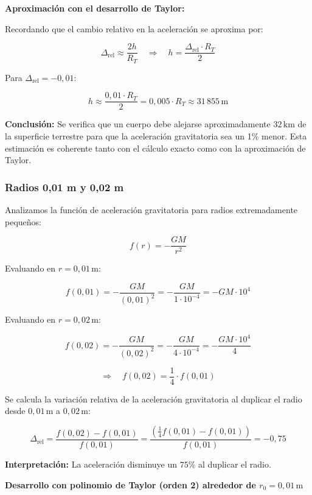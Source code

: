 \documentclass{article}
\begin{document}
\textbf{Aproximación con el desarrollo de Taylor:}

Recordando que el cambio relativo en la aceleración se aproxima por:

\[
\Delta_{\text{rel}} \approx \frac{2h}{R_T} \quad \Rightarrow \quad h = \frac{\Delta_{\text{rel}} \cdot R_T}{2}
\]

Para $\Delta_{\text{rel}} = -0{,}01$:

\[
h \approx \frac{0{,}01 \cdot R_T}{2} = 0{,}005 \cdot R_T \approx 31\,855\,\text{m}
\]

\vspace{0.5em}

\textbf{Conclusión:} Se verifica que un cuerpo debe alejarse aproximadamente $32\,\text{km}$ de la superficie terrestre para que la aceleración gravitatoria sea un 1\% menor. Esta estimación es coherente tanto con el cálculo exacto como con la aproximación de Taylor.

\subsubsection{Radios 0,01 m y 0,02 m}

Analizamos la función de aceleración gravitatoria para radios extremadamente pequeños:

\[
f(r) = -\frac{GM}{r^2}
\]

Evaluando en $r = 0{,}01\,\text{m}$:

\[
f(0{,}01) = -\frac{GM}{(0{,}01)^2} = -\frac{GM}{1 \cdot 10^{-4}} = -GM \cdot 10^4
\]

Evaluando en $r = 0{,}02\,\text{m}$:

\[
f(0{,}02) = -\frac{GM}{(0{,}02)^2} = -\frac{GM}{4 \cdot 10^{-4}} = -\frac{GM \cdot 10^4}{4}
\]

\[
\Rightarrow \quad f(0{,}02) = \frac{1}{4} \cdot f(0{,}01)
\]

Se calcula la variación relativa de la aceleración gravitatoria al duplicar el radio desde $0{,}01\,\text{m}$ a $0{,}02\,\text{m}$:

\[
\Delta_{\text{rel}} = \frac{f(0{,}02) - f(0{,}01)}{f(0{,}01)} = \frac{\left(\frac{1}{4}f(0{,}01) - f(0{,}01)\right)}{f(0{,}01)} = -0{,}75
\]

\textbf{Interpretación:} La aceleración disminuye un $75\%$ al duplicar el radio.

\vspace{0.5cm}

\textbf{Desarrollo con polinomio de Taylor (orden 2) alrededor de $r_0 = 0{,}01\,\text{m}$}
\end{document}
